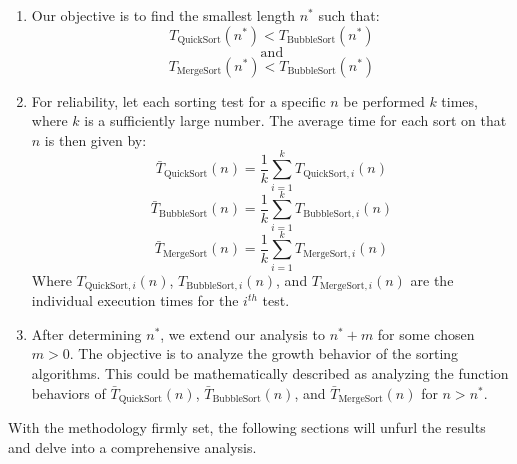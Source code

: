 \begin{enumerate}
\item Our objective is to find the smallest length \( n^* \) such that:
\[ T_{\text{QuickSort}}(n^*) < T_{\text{BubbleSort}}(n^*) \]
\[ \text{and} \]
\[ T_{\text{MergeSort}}(n^*) < T_{\text{BubbleSort}}(n^*) \]

\item For reliability, let each sorting test for a specific \( n \) be performed \( k \) times, where \( k \) is a sufficiently large number. The average time for each sort on that \( n \) is then given by:
\[ \bar{T}_{\text{QuickSort}}(n) = \frac{1}{k} \sum_{i=1}^{k} T_{\text{QuickSort},i}(n) \]
\[ \bar{T}_{\text{BubbleSort}}(n) = \frac{1}{k} \sum_{i=1}^{k} T_{\text{BubbleSort},i}(n) \]
\[ \bar{T}_{\text{MergeSort}}(n) = \frac{1}{k} \sum_{i=1}^{k} T_{\text{MergeSort},i}(n) \]
Where \( T_{\text{QuickSort},i}(n) \), \( T_{\text{BubbleSort},i}(n) \), and \( T_{\text{MergeSort},i}(n) \) are the individual execution times for the \( i^{th} \) test.

\item After determining \( n^* \), we extend our analysis to \( n^* + m \) for some chosen \( m > 0 \). The objective is to analyze the growth behavior of the sorting algorithms. This could be mathematically described as analyzing the function behaviors of \( \bar{T}_{\text{QuickSort}}(n) \), \( \bar{T}_{\text{BubbleSort}}(n) \), and \( \bar{T}_{\text{MergeSort}}(n) \) for \( n > n^* \).
\end{enumerate}

With the methodology firmly set, the following sections will unfurl the results and delve into a comprehensive analysis.
